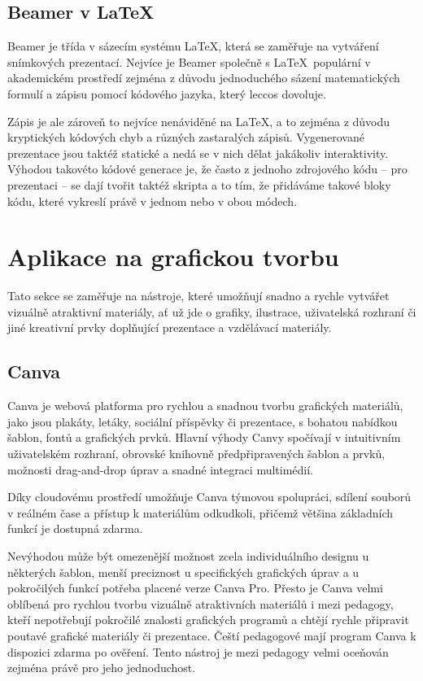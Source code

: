 \subsection{Beamer v \LaTeX}

Beamer je třída v sázecím systému \LaTeX, která se zaměřuje na vytváření snímkových prezentací.
Nejvíce je Beamer společně s \LaTeX~populární v akademickém prostředí zejména z důvodu jednoduchého sázení matematických formulí a zápisu pomocí kódového jazyka, který leccos dovoluje. 

Zápis je ale zároveň to nejvíce nenáviděné na \LaTeX{}, a to zejména z důvodu kryptických kódových chyb a různých zastaralých zápisů.
Vygenerované prezentace jsou taktéž statické a nedá se v nich dělat jakákoliv interaktivity. 
Výhodou takovéto kódové generace je, že často z jednoho zdrojového kódu -- pro prezentaci -- se dají tvořit taktéž skripta a to tím, že přidáváme takové bloky kódu, které vykreslí právě v jednom nebo v obou módech.

\section{Aplikace na grafickou tvorbu}

Tato sekce se zaměřuje na nástroje, které umožňují snadno a rychle vytvářet vizuálně atraktivní materiály, ať už jde o grafiky, ilustrace, uživatelská rozhraní či jiné kreativní prvky doplňující prezentace a vzdělávací materiály.

\subsection{Canva}\label{text:canva}
Canva je webová platforma pro rychlou a snadnou tvorbu grafických materiálů, jako jsou plakáty, letáky, sociální příspěvky či prezentace, s bohatou nabídkou šablon, fontů a grafických prvků. 
Hlavní výhody Canvy spočívají v intuitivním uživatelském rozhraní, obrovské knihovně předpřipravených šablon a prvků, možnosti drag-and-drop úprav a snadné integraci multimédií.

Díky cloudovému prostředí umožňuje Canva týmovou spolupráci, sdílení souborů v reálném čase a přístup k materiálům odkudkoli, přičemž většina základních funkcí je dostupná zdarma. 

Nevýhodou může být omezenější možnost zcela individuálního designu u některých šablon, menší preciznost u specifických grafických úprav a u pokročilých funkcí potřeba placené verze Canva Pro. 
Přesto je Canva velmi oblíbená pro rychlou tvorbu vizuálně atraktivních materiálů i mezi pedagogy, kteří nepotřebují pokročilé znalosti grafických programů a chtějí rychle připravit poutavé grafické materiály či prezentace.
Čeští pedagogové mají program Canva k dispozici zdarma po ověření. Tento nástroj je mezi pedagogy velmi oceňován zejména právě pro jeho jednoduchost.

